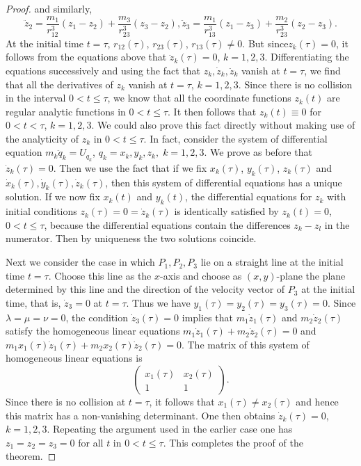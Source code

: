 \begin{proof}
and similarly, 
$$
\ddot{z}_2 = \frac{m_1}{r^3_{12}} (z_1 - z_2) + \frac{m_3}{r^3_{23}}
(z_3 - z_2) , \ddot{z}_3 = \frac{m_1}{r^3_{13}} (z_1 - z_3) +
\frac{m_2}{r^3_{23}} (z_2 - z_3).  
$$
At the initial time $t = \tau$, $r_{12} (\tau)$, $r_{23} (\tau)$,
$r_{13}(\tau) \neq 0$. But since\pageoriginale $z_k(\tau) = 0$, it
follows from the equations above that $\ddot{z}_k(\tau) = 0$, $k =
1,2,3$. Differentiating the equations successively and using the fact
that $z_k, \dot{z}_k, \ddot{z}_k$ vanish at $t = \tau$, we find that
all the derivatives of $z_k$ vanish at $t = \tau$, $k= 1,2,3$. Since
there is no collision in the interval $0 < t \leq \tau$, we know that
all the coordinate functions $z_k(t)$ are regular analytic functions
in $0 <t \leq \tau$. It then follows that $z_k (t) \equiv 0$ for $0 <
t <\tau$, $k =1 ,2,3$. We could also prove this fact directly without
making use of the analyticity of $z_k$ in $0 <t\leq \tau$. In fact,
consider the system of differential equation $m_k \ddot{q}_k =
U_{q_k}$, $q_k = x_k, y_k, z_k, \; k = 1,2,3$. We prove as before that
$\dot{z}_k(\tau) = 0$. Then we use the fact that if we fix
$x_k(\tau)$, $y_k (\tau)$, $z_k(\tau)$ and $\dot{x}_k(\tau),
\dot{y}_k(\tau), \dot{z}_k (\tau)$, then this system of differential
equations has a unique solution. If we now fix $x_k(t)$ and $y_k(t)$,
the differential equations for $z_k$ with initial conditions $z_k
(\tau) = 0 = \dot{z}_k(\tau)$ is identically satisfied by $z_k(t) =
0$, $0 < t \leq \tau$, because the differential equations contain the
differences $z_k - z_l$ in the numerator. Then by uniqueness the two
solutions coincide. 

Next we consider the case in which $P_1, P_2, P_3$ lie on a straight
line at the initial time $t = \tau$. Choose this line as the $x$-axis
and choose as $(x,y)$-plane the plane determined by this line and the
direction of the velocity vector of $P_3$ at the initial time, that
is, $\dot{z}_3 = 0$ at $t = \tau$. Thus we have $y_1(\tau) = y_2(\tau)
= y_3(\tau) = 0$. Since $\lambda = \mu = \nu = 0$, the condition
$\dot{z}_3(\tau) = 0$ implies that $m_1 \dot{z}_1(\tau)$ and $m_2
\dot{z}_2 (\tau)$ satisfy the homogeneous linear equations $m_1
\dot{z}_1(\tau) + m_2 \dot{z}_2 (\tau) = 0$ and\pageoriginale
$m_1x_1(\tau) \dot{z}_1(\tau) + m_2 x_2(\tau) \dot{z}_2(\tau) =
0$. The matrix of this system of homogeneous linear equations is 
$$
\begin{pmatrix}
x_1(\tau) & x_2 (\tau)\\
1 & 1
\end{pmatrix}.
$$
Since there is no collision at $t = \tau$, it follows that $x_1 (\tau)
\neq x_2(\tau)$ and hence this matrix has a non-vanishing
determinant. One then obtains $\dot{z}_k(\tau) = 0$, $k =
1,2,3$. Repeating the argument used in the earlier case one has $z_1 =
z_2 = z_3 = 0$ for all $t$ in $0 < t \leq \tau$. This completes the
proof of the theorem. 
\end{proof}

